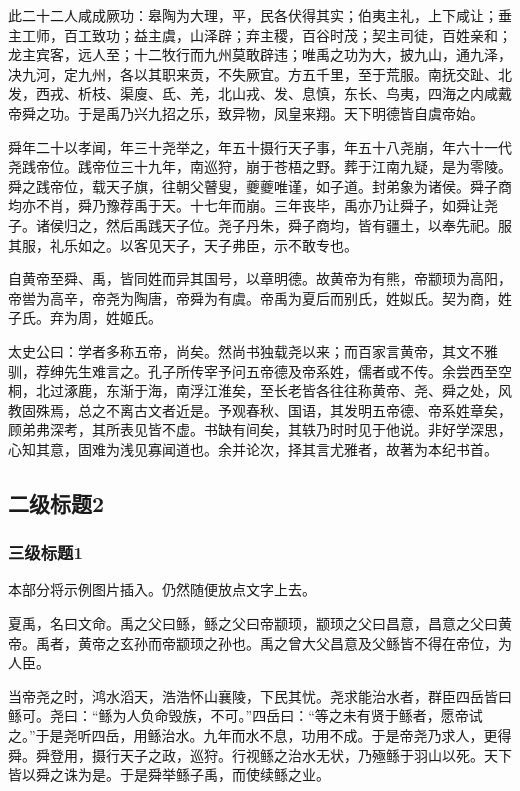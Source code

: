 \documentclass[UTF8,12pt,AutoFakeBold]{ctexart}
\begin{document}
	此二十二人咸成厥功：皋陶为大理，平，民各伏得其实；伯夷主礼，上下咸让；垂主工师，百工致功；益主虞，山泽辟；弃主稷，百谷时茂；契主司徒，百姓亲和；龙主宾客，远人至；十二牧行而九州莫敢辟违；唯禹之功为大，披九山，通九泽，决九河，定九州，各以其职来贡，不失厥宜。方五千里，至于荒服。南抚交趾、北发，西戎、析枝、渠廋、氐、羌，北山戎、发、息慎，东长、鸟夷，四海之内咸戴帝舜之功。于是禹乃兴九招之乐，致异物，凤皇来翔。天下明德皆自虞帝始。
	\par
	舜年二十以孝闻，年三十尧举之，年五十摄行天子事，年五十八尧崩，年六十一代尧践帝位。践帝位三十九年，南巡狩，崩于苍梧之野。葬于江南九疑，是为零陵。舜之践帝位，载天子旗，往朝父瞽叟，夔夔唯谨，如子道。封弟象为诸侯。舜子商均亦不肖，舜乃豫荐禹于天。十七年而崩。三年丧毕，禹亦乃让舜子，如舜让尧子。诸侯归之，然后禹践天子位。尧子丹朱，舜子商均，皆有疆土，以奉先祀。服其服，礼乐如之\cite{PhysRevLett.43.1365}。以客见天子，天子弗臣，示不敢专也。
	\par
	自黄帝至舜、禹，皆同姓而异其国号，以章明德。故黄帝为有熊，帝颛顼为高阳，帝喾为高辛，帝尧为陶唐，帝舜为有虞。帝禹为夏后而别氏，姓姒氏。契为商，姓子氏。弃为周，姓姬氏。
	\par
	太史公曰：学者多称五帝，尚矣。然尚书独载尧以来；而百家言黄帝，其文不雅驯，荐绅先生难言之。孔子所传宰予问五帝德及帝系姓，儒者或不传。余尝西至空桐，北过涿鹿，东渐于海，南浮江淮矣，至长老皆各往往称黄帝、尧、舜之处，风教固殊焉，总之不离古文者近是。予观春秋、国语，其发明五帝德、帝系姓章矣，顾弟弗深考，其所表见皆不虚。书缺有间矣，其轶乃时时见于他说。非好学深思，心知其意，固难为浅见寡闻道也。余并论次，择其言尤雅者，故著为本纪书首。
	
	
	
	
	
	\subsection{二级标题2\label{章节：二级标题2}}
	
	\subsubsection{三级标题1\label{章节：三级标题1}}
	
	本部分将示例图片插入。仍然随便放点文字上去。
	
	夏禹，名曰文命。禹之父曰鲧，鲧之父曰帝颛顼，颛顼之父曰昌意，昌意之父曰黄帝。禹者，黄帝之玄孙而帝颛顼之孙也。禹之曾大父昌意及父鲧皆不得在帝位，为人臣。
	
	当帝尧之时，鸿水滔天，浩浩怀山襄陵，下民其忧。尧求能治水者，群臣四岳皆曰鲧可。尧曰：“鲧为人负命毁族，不可。”四岳曰：“等之未有贤于鲧者，愿帝试之。”于是尧听四岳，用鲧治水。九年而水不息，功用不成。于是帝尧乃求人，更得舜。舜登用，摄行天子之政，巡狩。行视鲧之治水无状，乃殛鲧于羽山以死。天下皆以舜之诛为是。于是舜举鲧子禹，而使续鲧之业。
	
\end{document}

